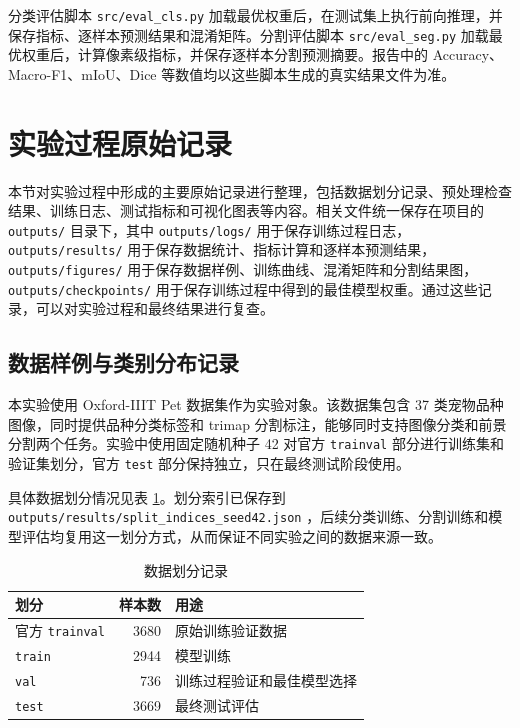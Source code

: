\documentclass[UTF8,a4paper,12pt]{ctexart}
\newcommand{\code}[1]{%
  \begingroup
  \def\UrlFont{\ttfamily}%
  \nolinkurl{#1}%
  \endgroup
}
\begin{document}
分类评估脚本 \texttt{src/eval\_cls.py} 加载最优权重后，在测试集上执行前向推理，并保存指标、逐样本预测结果和混淆矩阵。分割评估脚本 \texttt{src/eval\_seg.py} 加载最优权重后，计算像素级指标，并保存逐样本分割预测摘要。报告中的 Accuracy、Macro-F1、mIoU、Dice 等数值均以这些脚本生成的真实结果文件为准。

\section{实验过程原始记录}

本节对实验过程中形成的主要原始记录进行整理，包括数据划分记录、预处理检查结果、训练日志、测试指标和可视化图表等内容。相关文件统一保存在项目的 \code{outputs/} 目录下，其中 \code{outputs/logs/} 用于保存训练过程日志，\code{outputs/results/} 用于保存数据统计、指标计算和逐样本预测结果，\code{outputs/figures/} 用于保存数据样例、训练曲线、混淆矩阵和分割结果图，\code{outputs/checkpoints/} 用于保存训练过程中得到的最佳模型权重。通过这些记录，可以对实验过程和最终结果进行复查。

\subsection{数据样例与类别分布记录}

本实验使用 Oxford-IIIT Pet 数据集作为实验对象。该数据集包含 37 类宠物品种图像，同时提供品种分类标签和 trimap 分割标注，能够同时支持图像分类和前景分割两个任务。实验中使用固定随机种子 42 对官方 \code{trainval} 部分进行训练集和验证集划分，官方 \code{test} 部分保持独立，只在最终测试阶段使用。

具体数据划分情况见表 \ref{tab:data-split-record}。划分索引已保存到 \code{outputs/results/split_indices_seed42.json}，后续分类训练、分割训练和模型评估均复用这一划分方式，从而保证不同实验之间的数据来源一致。

\begin{table}[H]
\centering
\caption{数据划分记录}
\label{tab:data-split-record}
\renewcommand{\arraystretch}{1.2}
\setlength{\tabcolsep}{10pt}
\begin{tabular}{lrl}
\toprule
划分 & 样本数 & 用途 \\
\midrule
官方 \texttt{trainval} & 3680 & 原始训练验证数据 \\
\texttt{train} & 2944 & 模型训练 \\
\texttt{val} & 736 & 训练过程验证和最佳模型选择 \\
\texttt{test} & 3669 & 最终测试评估 \\
\bottomrule
\end{tabular}
\end{table}
\end{document}
